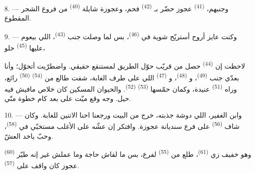 8. --- وجنبهم،  \textsuperscript{(41)} عجوز حضّر بـ
 \textsuperscript{(42)} فحم، وعجوزة شايلة  \textsuperscript{(40)}
 من فروع الشجر المقطوع.

\VUsaut{3.0mm}
\VUsaut{3.0mm}

9. --- وكنت عايز أروح أستريّح شوية في  \textsuperscript{(46)}، بس
لما وصلت جنب  \textsuperscript{(43)}، اللي بيعوم عليها
 \textsuperscript{(45)} حلو،

لاحظت إن  \textsuperscript{(44)} حصل من قريّب حوّل الطريق لمستنقع
حقيقي. واضطرّيت أتحوّل؛ وأنا بعدّي جنب  \textsuperscript{(49)}،
و \textsuperscript{(48)}، و \textsuperscript{(47)} اللي على
طرف الغابة، شفت طالع من  \textsuperscript{(54)} 
\textsuperscript{(50)} رائع، وراه  \textsuperscript{(51)} عنيدة، وكمان
حمّسها  \textsuperscript{(53)} 
\textsuperscript{(52)}. والحيوان المسكين كان خلاص مافيش فيه حيل. وجه وقع ميّت على
بعد كام خطوة منّي.

10. --- وابن الغفير، اللي دوشة  جذبته، خرج من البيت ورجعنا
احنا الاتنين للغابة. وكان شاف  \textsuperscript{(56)} على فرع سنديانة
عجوزة. وافتكر إن عشّه على الأغلب مستخبّي في  \textsuperscript{(58)}،
وحبّ ياخد العشّ.

وهو خفيف زي  \textsuperscript{(61)}، طلع من 
\textsuperscript{(55)} لفرع، بس ما لقاش حاجة وما عملش غير إنه طيّر 
\textsuperscript{(60)} عجوز كان واقف على  \textsuperscript{(57)}.

\VUsaut{4.0mm}
\VUfilet{22mm}

